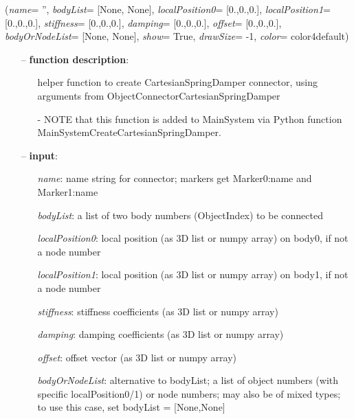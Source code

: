 %
\begin{flushleft}
\label{sec:mainsystemextensions:CreateCartesianSpringDamper}
({\it name}= '', {\it bodyList}= [None, None], {\it localPosition0}= [0.,0.,0.], {\it localPosition1}= [0.,0.,0.], {\it stiffness}= [0.,0.,0.], {\it damping}= [0.,0.,0.], {\it offset}= [0.,0.,0.], {\it bodyOrNodeList}= [None, None], {\it show}= True, {\it drawSize}= -1, {\it color}= color4default)
\end{flushleft}
\setlength{\itemindent}{0.7cm}
\begin{itemize}[leftmargin=0.7cm]
\item[--]
{\bf function description}: \vspace{-6pt}
\begin{itemize}[leftmargin=1.2cm]
\setlength{\itemindent}{-0.7cm}
\item[]helper function to create CartesianSpringDamper connector, using arguments from ObjectConnectorCartesianSpringDamper
\item[]- NOTE that this function is added to MainSystem via Python function MainSystemCreateCartesianSpringDamper.
\end{itemize}
\item[--]
{\bf input}: \vspace{-6pt}
\begin{itemize}[leftmargin=1.2cm]
\setlength{\itemindent}{-0.7cm}
\item[]{\it name}: name string for connector; markers get Marker0:name and Marker1:name
\item[]{\it bodyList}: a list of two body numbers (ObjectIndex) to be connected
\item[]{\it localPosition0}: local position (as 3D list or numpy array) on body0, if not a node number
\item[]{\it localPosition1}: local position (as 3D list or numpy array) on body1, if not a node number
\item[]{\it stiffness}: stiffness coefficients (as 3D list or numpy array)
\item[]{\it damping}: damping coefficients (as 3D list or numpy array)
\item[]{\it offset}: offset vector (as 3D list or numpy array)
\item[]{\it bodyOrNodeList}: alternative to bodyList; a list of object numbers (with specific localPosition0/1) or node numbers; may also be of mixed types; to use this case, set bodyList = [None,None]

\end{itemize}
\end{itemize}
